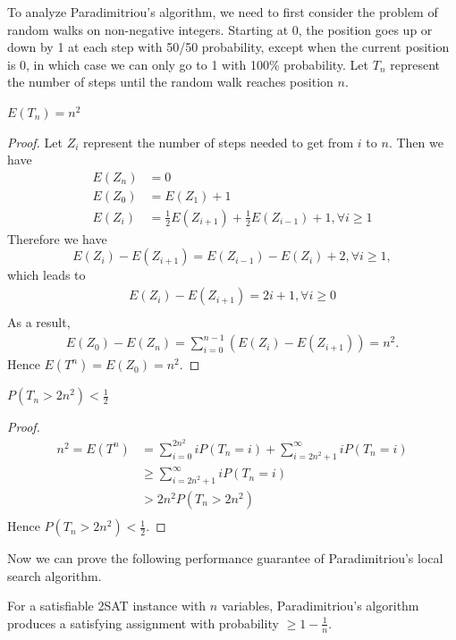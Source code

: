To analyze Paradimitriou's algorithm, we need to first consider the problem of random walks on non-negative integers. Starting at 0, the position goes up or down by 1 at each step with 50/50 probability, except when the current position is 0, in which case we can only go to 1 with 100\% probability. Let $T_n$ represent the number of steps until the random walk reaches position $n$. 
\begin{theorem}
$E(T_n)=n^2$
\end{theorem}
\begin{proof}
Let $Z_i$ represent the number of steps needed to get from $i$ to $n$. Then we have
\begin{align*}
E(Z_n)&=0\\
E(Z_0)&=E(Z_1)+1\\
E(Z_i)&=\frac{1}{2}E(Z_{i+1})+\frac{1}{2}E(Z_{i-1})+1,\forall i\geq 1
\end{align*}
Therefore we have
\begin{equation*}
E(Z_i)-E(Z_{i+1})=E(Z_{i-1})-E(Z_i)+2,\forall i\geq 1,
\end{equation*}
which leads to 
\begin{align*}
E(Z_i)-E(Z_{i+1})=2i+1,\forall i\geq 0\\
\end{align*}
As a result,
\begin{align*}
E(Z_0)-E(Z_n)=\sum\limits_{i=0}^{n-1}\left(E(Z_i)-E(Z_{i+1})\right)=n^2.
\end{align*}
Hence $E(T^n)=E(Z_0)=n^2.$
\end{proof}
\begin{corollary}\label{localsearchcorollary}
$P\left(T_n>2n^2\right)<\frac{1}{2}$
\end{corollary}
\begin{proof}
\begin{align*}
n^2=E(T^n)&=\sum\limits_{i=0}^{2n^2}iP(T_n=i)+\sum\limits_{i=2n^2+1}^{\infty}iP(T_n=i)\\
&\geq\sum\limits_{i=2n^2+1}^{\infty}iP(T_n=i)\\
&>2n^2P\left(T_n>2n^2\right)\\
\end{align*}
Hence $P\left(T_n>2n^2\right)<\frac{1}{2}.$
\end{proof}
Now we can prove the following performance guarantee of Paradimitriou's local search algorithm.
\begin{theorem}
For a satisfiable 2SAT instance with $n$ variables, Paradimitriou's algorithm produces a satisfying assignment with probability $\geq 1-\frac{1}{n}$.
\end{theorem}
